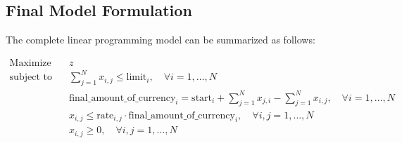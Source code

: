 \documentclass{article}
\begin{document}
\subsection*{Final Model Formulation}
The complete linear programming model can be summarized as follows:

\[
\begin{align*}
\text{Maximize} \quad & z \\
\text{subject to} \quad & \sum_{j=1}^{N} x_{i,j} \leq \text{limit}_i, \quad \forall i = 1, \ldots, N \\
                       & \text{final\_amount\_of\_currency}_i = \text{start}_i + \sum_{j=1}^{N} x_{j,i} - \sum_{j=1}^{N} x_{i,j}, \quad \forall i = 1, \ldots, N \\
                       & x_{i,j} \leq \text{rate}_{i,j} \cdot \text{final\_amount\_of\_currency}_i, \quad \forall i, j = 1, \ldots, N \\
                       & x_{i,j} \geq 0, \quad \forall i, j = 1, \ldots, N
\end{align*}
\]
\end{document}
